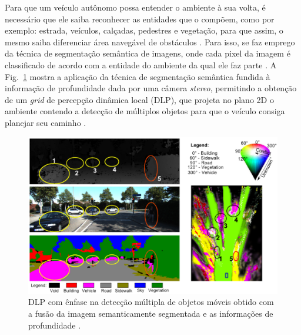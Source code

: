 \documentclass[conference]{IEEEtran}
\begin{document}
Para que um veículo autônomo possa entender o ambiente à sua volta, é necessário que ele saiba reconhecer as entidades que o compõem, como por exemplo: estrada, veículos, calçadas, pedestres e vegetação, para que assim, o mesmo saiba diferenciar área navegável de obstáculos \cite{jebamikyousAutonomousVehiclesPerception2022}. Para isso, se faz emprego da técnica de segmentação semântica de imagens, onde cada pixel da imagem é classificado de acordo com a entidade do ambiente da qual ele faz parte \cite{he2016ImageSegmentationTechniques}. A Fig.~\ref{fig:dynamiclocalperception} mostra a aplicação da técnica de segmentação semântica fundida à informação de profundidade dada por uma câmera \textit{stereo}, permitindo a obtenção de um \textit{grid} de percepção dinâmica local (DLP), que projeta no plano 2D o ambiente contendo a detecção de múltiplos objetos para que o veículo consiga planejar seu caminho \cite{vitor2021ModelingEvidentialGrids}.

\begin{figure}[h!]
	\centering
	\includegraphics[width=\linewidth]{img/dynamic_local_perception}
	\caption{DLP com ênfase na detecção múltipla de objetos móveis obtido com a fusão da imagem semanticamente segmentada e as informações de profundidade \cite{vitor2021ModelingEvidentialGrids}.}
	\label{fig:dynamiclocalperception}
\end{figure}
\end{document}
